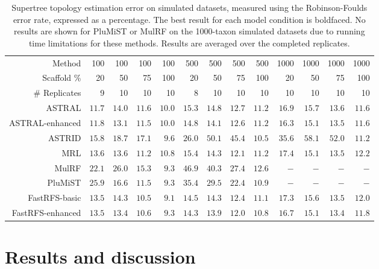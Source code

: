 \begin{table}
\centering
\begin{tabular}{|r|rrrrrrrrrrrr|}
\hline
Method&100 & 100 & 100 & 100 & 500 & 500 & 500 & 500 & 1000 & 1000 & 1000 &
1000\\
Scaffold \% &20 & 50 & 75 & 100 & 20 & 50 & 75 & 100 & 20 & 50 & 75 & 100\\
\# Replicates & 9 & 10 & 10 & 10 & 8 & 10 & 10 & 10 & 10 & 10 & 10 & 10 \\
\hline
\hline
ASTRAL& $\mathbf{11.7}$&$14.0$& $11.6$& $10.0$& $15.3$& $14.8$& $12.7$& $11.2$& $16.9$& $15.7$& $13.6$& $11.6$\\
ASTRAL-enhanced&$11.8$& $\mathbf{13.1}$&$11.5$& $10.0$& $14.8$&$14.1$& $12.6$& $11.2$& $\mathbf{16.3}$&$\mathbf{15.1}$&$13.5$&$11.6$\\
ASTRID& $15.8$& $18.7$& $17.1$&$9.6$&$26.0$& $50.1$& $45.4$&$\mathbf{10.5}$&$35.6$& $58.1$& $52.0$& $\mathbf{11.2}$\\
MRL&$13.6$& $13.6$& $11.2$& $10.8$& $15.4$& $14.3$& $12.1$& $11.2$& $17.4$&$\mathbf{15.1}$&$13.5$& $12.2$\\
MulRF&$22.1$& $26.0$& $15.3$& $9.3$&$46.9$& $40.3$& $27.4$& $12.6$& $-$&$-$&$-$&$-$\\
PluMiST&$25.9$& $16.6$& $11.5$& $9.3$&$35.4$& $29.5$& $22.4$& $10.9$&$-$&$-$&$-$&$-$\\
\hline
FastRFS-basic&$13.5$& $14.3$& $\mathbf{10.5}$&$\mathbf{9.1}$& $14.5$&$14.3$& $12.4$& $11.1$& $17.3$& $15.6$& $13.5$& $12.0$\\
FastRFS-enhanced&$13.5$& $13.4$& $10.6$& $9.3$&$\mathbf{14.3}$&$\mathbf{13.9}$&$\mathbf{12.0}$&$10.8$& $16.7$&$\mathbf{15.1}$&$\mathbf{13.4}$&$11.8$\\
\hline
\end{tabular}
  \caption[Supertree estimation error on simulated datasets for FastRFS and other methods]{Supertree topology estimation error on simulated datasets,
 measured using the Robinson-Foulds error rate, expressed
as a percentage.
The best result for each model condition is boldfaced. No results are shown
for PluMiST or MulRF on the 1000-taxon simulated datasets due to
running time limitations for these methods.
Results are averaged over the completed replicates. }
  \label{fastrfs::table:exp1-topo}
\end{table}




\section{Results and discussion}
\label{fastrfs::sec:results}

